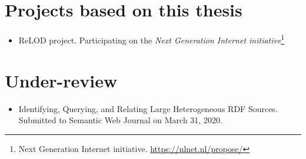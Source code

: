 \section{Projects based on this thesis}
\begin{itemize}
    \item ReLOD project. Participating on the \textit{Next Generation Internet initiative}\footnote{Next Generation Internet initiative. \url{https://nlnet.nl/propose/}}
\end{itemize}

\section{Under-review}

\begin{itemize}
    \item Identifying, Querying, and Relating Large Heterogeneous RDF Sources. Submitted to Semantic Web Journal on March 31, 2020\cite{valdestilhasSWJ2020}.
\end{itemize}
